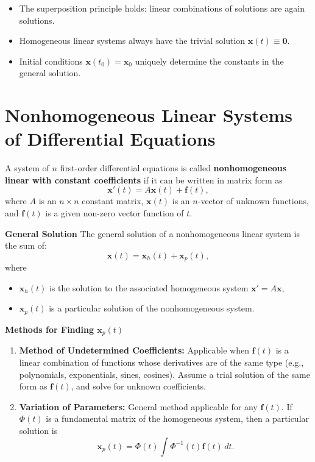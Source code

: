     \begin{itemize}
      \item The superposition principle holds: linear combinations of solutions are again solutions.
      \item Homogeneous linear systems always have the trivial solution $\mathbf{x}(t) \equiv \mathbf{0}$.
      \item Initial conditions $\mathbf{x}(t_0) = \mathbf{x}_0$ uniquely determine the constants in the general solution.
    \end{itemize}


  \section{Nonhomogeneous Linear Systems of Differential Equations}

    \begin{definition}
      A system of $n$ first-order differential equations is called \textbf{nonhomogeneous linear with constant coefficients} if it can be written in matrix form as
    \[
    \mathbf{x}'(t) = A \mathbf{x}(t) + \mathbf{f}(t),
    \]
    where $A$ is an $n \times n$ constant matrix, $\mathbf{x}(t)$ is an $n$-vector of unknown functions, and $\mathbf{f}(t)$ is a given non-zero vector function of $t$.
    \end{definition}
    
    \textbf{General Solution}
      The general solution of a nonhomogeneous linear system is the sum of:
      \[
      \mathbf{x}(t) = \mathbf{x}_h(t) + \mathbf{x}_p(t),
      \]
      where
      \begin{itemize}
        \item $\mathbf{x}_h(t)$ is the solution to the associated homogeneous system $\mathbf{x}' = A\mathbf{x}$,
        \item $\mathbf{x}_p(t)$ is a particular solution of the nonhomogeneous system.
      \end{itemize}

    \textbf{Methods for Finding $\mathbf{x}_p(t)$}
    \begin{enumerate}
      \item \textbf{Method of Undetermined Coefficients:}  
      Applicable when $\mathbf{f}(t)$ is a linear combination of functions whose derivatives are of the same type (e.g., polynomials, exponentials, sines, cosines). Assume a trial solution of the same form as $\mathbf{f}(t)$, and solve for unknown coefficients.

      \item \textbf{Variation of Parameters:}  
      General method applicable for any $\mathbf{f}(t)$. If $\Phi(t)$ is a fundamental matrix of the homogeneous system, then a particular solution is
      \[
      \mathbf{x}_p(t) = \Phi(t) \int \Phi^{-1}(t) \mathbf{f}(t)\, dt.
      \]
    \end{enumerate}

